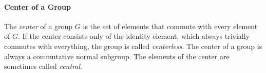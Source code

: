 



\paragraph{Center of a Group}
The \emph{center} of a group $G$ is the set of elements that commute with every element of $G$. If the center consists only of the identity element, which always trivially commutes with everything, the group is called \emph{centerless}. The center of a group is always a commutative normal subgroup. The elements of the center are sometimes called \emph{central}.





